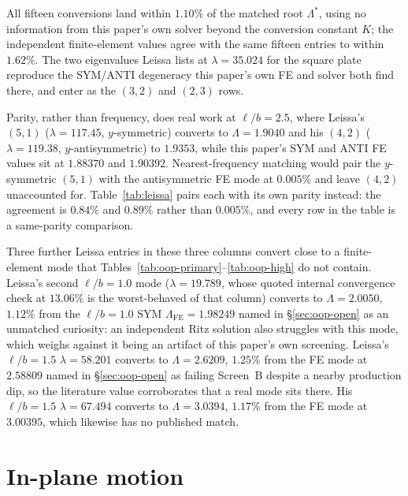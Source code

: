\documentclass[11pt]{article}
\begin{document}
All fifteen conversions land within $1.10\%$ of the matched root
$\Lambda^{*}$, using no information from this paper's own solver beyond the
conversion constant $K$; the independent finite-element values agree with
the same fifteen entries to within $1.62\%$. The two eigenvalues Leissa
lists at $\lambda=35.024$ for the square plate reproduce the SYM/ANTI
degeneracy this paper's own FE and solver both find there, and enter as the
$(3,2)$ and $(2,3)$ rows.

Parity, rather than frequency, does real work at $\ell/b=2.5$, where
Leissa's $(5,1)$ ($\lambda=117.45$, $y$-symmetric) converts to
$\Lambda=1.9040$ and his $(4,2)$ ($\lambda=119.38$, $y$-antisymmetric) to
$1.9353$, while this paper's SYM and ANTI FE values sit at $1.88370$ and
$1.90392$. Nearest-frequency matching would pair the $y$-symmetric
$(5,1)$ with the antisymmetric FE mode at $0.005\%$ and leave $(4,2)$
unaccounted for. Table~\ref{tab:leissa} pairs each with its own parity
instead: the agreement is $0.84\%$ and $0.89\%$ rather than $0.005\%$, and
every row in the table is a same-parity comparison.

Three further Leissa entries in these three columns convert close to a
finite-element mode that Tables~\ref{tab:oop-primary}--\ref{tab:oop-high}
do not contain. Leissa's second $\ell/b=1.0$ mode ($\lambda=19.789$, whose
quoted internal convergence check at $13.06\%$ is the worst-behaved of that
column) converts to $\Lambda=2.0050$, $1.12\%$ from the $\ell/b=1.0$ SYM
$\Lambda_{\mathrm{FE}}=1.98249$ named in \S\ref{sec:oop-open} as an
unmatched curiosity: an independent Ritz solution also struggles with this
mode, which weighs against it being an artifact of this paper's own
screening. Leissa's $\ell/b=1.5$ $\lambda=58.201$ converts to
$\Lambda=2.6209$, $1.25\%$ from the FE mode at $2.58809$ named in
\S\ref{sec:oop-open} as failing Screen~B despite a nearby production dip,
so the literature value corroborates that a real mode sits there. His
$\ell/b=1.5$ $\lambda=67.494$ converts to $\Lambda=3.0394$, $1.17\%$ from
the FE mode at $3.00395$, which likewise has no published match.

\section{In-plane motion}\label{sec:ip}
\end{document}
